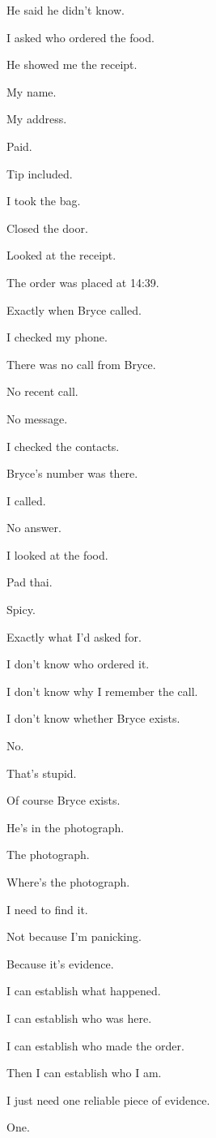\documentclass[11pt,oneside]{book}
\begin{document}
He said he didn't know.

I asked who ordered the food.

He showed me the receipt.

My name.

My address.

Paid.

Tip included.

I took the bag.

Closed the door.

Looked at the receipt.

The order was placed at 14:39.

Exactly when Bryce called.

I checked my phone.

There was no call from Bryce.

No recent call.

No message.

I checked the contacts.

Bryce's number was there.

I called.

No answer.

I looked at the food.

Pad thai.

Spicy.

Exactly what I'd asked for.

I don't know who ordered it.

I don't know why I remember the call.

I don't know whether Bryce exists.

No.

That's stupid.

Of course Bryce exists.

He's in the photograph.

The photograph.

Where's the photograph.

I need to find it.

Not because I'm panicking.

Because it's evidence.

I can establish what happened.

I can establish who was here.

I can establish who made the order.

Then I can establish who I am.

I just need one reliable piece of evidence.

One.
\end{document}
